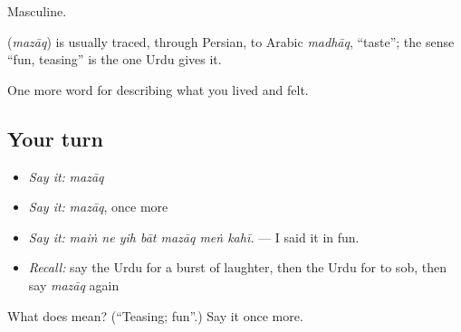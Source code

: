 Masculine.

\begin{cousinweb}
\textbf{} (\emph{mazāq}) is usually traced, through Persian, to Arabic \emph{madhāq}, \textquotedblleft{}taste\textquotedblright{}; the sense \textquotedblleft{}fun, teasing\textquotedblright{} is the one Urdu gives it.
\end{cousinweb}

\begin{grammarlens}[title={What you've built}]
One more word for describing what you lived and felt.
\end{grammarlens}

\subsection*{Your turn}
\begin{itemize}
\raggedright
  \item \emph{Say it:} \emph{mazāq}
  \item \emph{Say it:} \emph{mazāq}, once more
  \item \emph{Say it:} \emph{maiṅ ne yih bāt mazāq meṅ kahī.} — I said it in fun.
  \item \emph{Recall:} say the Urdu for a burst of laughter, then the Urdu for to sob, then say \emph{mazāq} again
\end{itemize}

\begin{tcolorbox}[breakable,colback=teal!4,colframe=teal!35!black,title={Before you move on}]
What does  mean? (\textquotedblleft{}Teasing; fun\textquotedblright{}.) Say it once more.
\end{tcolorbox}
